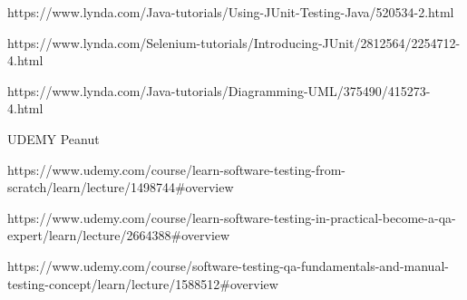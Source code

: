 

https://www.lynda.com/Java-tutorials/Using-JUnit-Testing-Java/520534-2.html

https://www.lynda.com/Selenium-tutorials/Introducing-JUnit/2812564/2254712-4.html

https://www.lynda.com/Java-tutorials/Diagramming-UML/375490/415273-4.html


UDEMY Peanut  

https://www.udemy.com/course/learn-software-testing-from-scratch/learn/lecture/1498744#overview

https://www.udemy.com/course/learn-software-testing-in-practical-become-a-qa-expert/learn/lecture/2664388#overview 

https://www.udemy.com/course/software-testing-qa-fundamentals-and-manual-testing-concept/learn/lecture/1588512#overview


